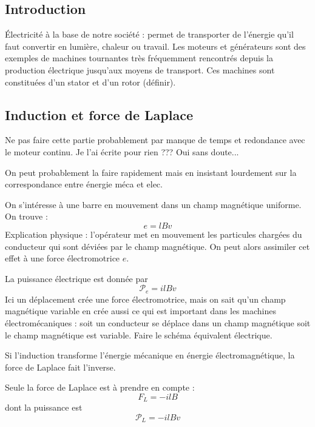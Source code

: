 \subsection*{Introduction}

Électricité à la base de notre société : permet de transporter de l'énergie qu'il faut convertir en lumière, chaleur ou travail.
Les moteurs et générateurs sont des exemples de machines tournantes très fréquemment rencontrés depuis la production électrique jusqu'aux moyens de transport.
Ces machines sont constituées d'un stator et d'un rotor (définir).

\subsection{Induction et force de Laplace}

\begin{remarque}
Ne pas faire cette partie probablement par manque de temps et redondance avec le moteur continu.
Je l'ai écrite pour rien ???
Oui sans doute...
\end{remarque}

On peut probablement la faire rapidement mais en insistant lourdement sur la correspondance entre énergie méca et elec.

On s'intéresse à une barre en mouvement dans un champ magnétique uniforme.
On trouve :
\begin{equation}
e = lBv
\end{equation}
Explication physique : l'opérateur met en mouvement les particules chargées du conducteur qui sont déviées par le champ magnétique.
On peut alors assimiler cet effet à une force électromotrice $e$.

La puissance électrique est donnée par 
\begin{equation}
{\mathcal{P}}_e = ilBv
\end{equation}
Ici un déplacement crée une force électromotrice, mais on sait qu'un champ magnétique variable en crée aussi ce qui est important dans les machines électromécaniques : soit un conducteur se déplace dans un champ magnétique soit le champ magnétique est variable.
Faire le schéma équivalent électrique.

Si l'induction transforme l'énergie mécanique en énergie électromagnétique, la force de Laplace fait l'inverse.

Seule la force de Laplace est à prendre en compte :
\begin{equation}
F_L = -ilB
\end{equation}
dont la puissance est
\begin{equation}
{\mathcal{P}}_L = -ilBv
\end{equation}

